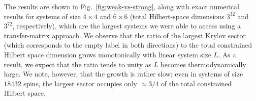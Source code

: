 The results are shown in Fig.~\ref{fig:weak-vs-strong}, along with exact numerical results for systems of size $4\times 4$ and $6 \times 6$ (total Hilbert-space dimensions $3^{32}$ and $3^{72}$, respectively), which are the largest systems we were able to access using a transfer-matrix approach. We observe that the ratio of the largest Krylov sector (which corresponds to the empty label in both directions) to the total constrained Hilbert space dimension grows monotonically with linear system size $L$. As a result, we expect that the ratio tends to unity as $L$ becomes thermodynamically large.
We note, however, that the growth is rather slow; even in systems of size $18432$ spins, the largest sector occupies only $\approx 3/4$ of the total constrained Hilbert space.



